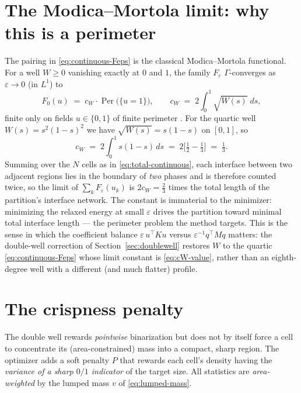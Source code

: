 \documentclass[11pt,a4paper]{article}
\begin{document}
\section{The Modica--Mortola limit: why this is a perimeter}
\label{sec:gamma}

The pairing in \eqref{eq:continuous-Feps} is the classical Modica--Mortola
functional. For a well $W\ge0$ vanishing exactly at $0$ and $1$, the family
$F_\varepsilon$ $\Gamma$-converges as $\varepsilon\to0$ (in $L^1$) to
\begin{equation}
  F_0(u) \;=\; c_W \cdot \operatorname{Per}\big(\{u = 1\}\big),
  \qquad
  c_W \;=\; 2\int_0^1 \sqrt{W(s)}\; ds,
  \label{eq:MM-limit}
\end{equation}
finite only on fields $u\in\{0,1\}$ of finite perimeter \cite{modica1987gradient}. For
the quartic well $W(s)=s^2(1-s)^2$ we have $\sqrt{W(s)} = s(1-s)$ on $[0,1]$, so
\begin{equation}
  c_W \;=\; 2\int_0^1 s(1-s)\,ds
        \;=\; 2\Big[\tfrac12 - \tfrac13\Big]
        \;=\; \tfrac13 .
  \label{eq:cW-value}
\end{equation}
Summing over the $N$ cells as in \eqref{eq:total-continuous}, each interface between
two adjacent regions lies in the boundary of \emph{two} phases and is therefore
counted twice, so the limit of $\sum_k F_\varepsilon(u_k)$ is $2c_W = \tfrac23$ times
the total length of the partition's interface network. The constant is immaterial to
the minimizer: minimizing the relaxed energy at small $\varepsilon$ drives the
partition toward minimal total interface length --- the perimeter problem the method
targets. This is the sense in which the coefficient balance $\varepsilon\,u^\top K u$
versus $\varepsilon^{-1} q^\top M q$ matters: the double-well correction of
Section~\ref{sec:doublewell} restores $W$ to the quartic \eqref{eq:continuous-Feps}
whose limit constant is \eqref{eq:cW-value}, rather than an eighth-degree well with a
different (and much flatter) profile.

\section{The crispness penalty}
\label{sec:penalty}

The double well rewards \emph{pointwise} binarization but does not by itself force a
cell to concentrate its (area-constrained) mass into a compact, sharp region. The
optimizer adds a soft penalty $P$ that rewards each cell's density having the
\emph{variance of a sharp $0/1$ indicator} of the target size. All statistics are
\emph{area-weighted} by the lumped mass $v$ of \eqref{eq:lumped-mass}.
\end{document}

